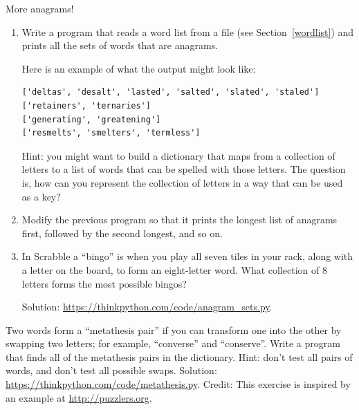 \documentclass[10pt]{book}
\begin{document}
\begin{exercise}
\label{anagrams}

More anagrams!

\begin{enumerate}

\item Write a program
that reads a word list from a file (see Section~\ref{wordlist}) and
prints all the sets of words that are anagrams.

Here is an example of what the output might look like:

\begin{verbatim}
['deltas', 'desalt', 'lasted', 'salted', 'slated', 'staled']
['retainers', 'ternaries']
['generating', 'greatening']
['resmelts', 'smelters', 'termless']
\end{verbatim}
%
Hint: you might want to build a dictionary that maps from a
collection of letters to a list of words that can be spelled with those
letters.  The question is, how can you represent the collection of
letters in a way that can be used as a key?

\item Modify the previous program so that it prints the longest list
of anagrams first, followed by the second longest, and so on.

\item In Scrabble a ``bingo'' is when you play all seven tiles in
your rack, along with a letter on the board, to form an eight-letter
word.  What collection of 8 letters forms the most possible bingos?


Solution: \url{https://thinkpython.com/code/anagram_sets.py}.

\end{enumerate}
\end{exercise}

\begin{exercise}

Two words form a ``metathesis pair'' if you can transform one into the
other by swapping two letters; for example, ``converse'' and
``conserve''.  Write a program that finds all of the metathesis pairs
in the dictionary.  Hint: don't test all pairs of words, and don't
test all possible swaps.  Solution:
\url{https://thinkpython.com/code/metathesis.py}.  Credit: This
exercise is inspired by an example at \url{http://puzzlers.org}.

\end{exercise}
\end{document}

